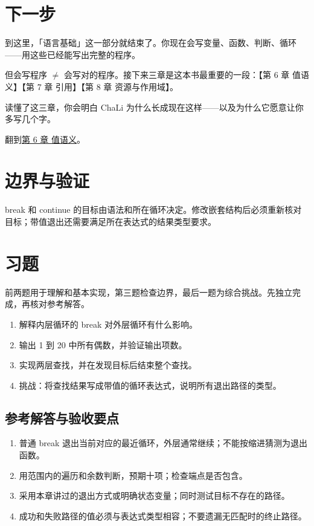 \section{下一步}

到这里，「语言基础」这一部分就结束了。你现在会写变量、函数、判断、循环——用这些已经能写出完整的程序。

但会写程序 \ensuremath{\neq} 会写对的程序。接下来三章是这本书最重要的一段：【第 6 章 值语义】【第 7 章 引用】【第 8 章 资源与作用域】。

读懂了这三章，你会明白 ChaLi 为什么长成现在这样——以及为什么它愿意让你多写几个字。

翻到\hyperref[ch:06]{第 6 章 值语义}。

\section{边界与验证}

break 和 continue 的目标由语法和所在循环决定。修改嵌套结构后必须重新核对目标；带值退出还需要满足所在表达式的结果类型要求。

\section{习题}

前两题用于理解和基本实现，第三题检查边界，最后一题为综合挑战。先独立完成，再核对参考解答。

\begin{enumerate}

\item 解释内层循环的 break 对外层循环有什么影响。

\item 输出 1 到 20 中所有偶数，并验证输出项数。

\item 实现两层查找，并在发现目标后结束整个查找。

\item 挑战：将查找结果写成带值的循环表达式，说明所有退出路径的类型。

\end{enumerate}

\subsection*{参考解答与验收要点}

\begin{enumerate}

\item 普通 break 退出当前对应的最近循环，外层通常继续；不能按缩进猜测为退出函数。

\item 用范围内的遍历和余数判断，预期十项；检查端点是否包含。

\item 采用本章讲过的退出方式或明确状态变量；同时测试目标不存在的路径。

\item 成功和失败路径的值必须与表达式类型相容；不要遗漏无匹配时的终止路径。

\end{enumerate}

